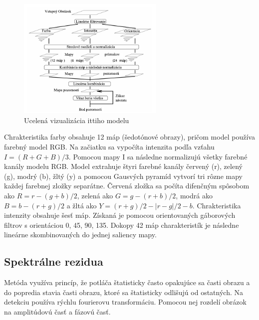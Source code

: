 \begin{figure}[H]
 \centering
 \includegraphics[width=7cm]{pics/itti-1-svk.png}
 \caption{Ucelená vizualizácia ittiho modelu\cite{itty-98}}\label{wrap-fig:1}
\end{figure}
\vspace{10mm}

Chrakteristika farby obsahuje 12 máp (šedotónové obrazy), pričom model používa farebný model RGB.
Na začiatku sa vypočíta intenzita podľa vzťahu \begin{math} I = (R+G+B)/3\end{math}.
Pomocou mapy I sa následne normalizujú všetky farebné kanály modelu RGB.
Model extrahuje štyri farebné kanály červený (r), zelený (g), modrý (b), žltý (y) a pomocou Gausvých pyramíd vytvorí tri rôzne mapy každej farebnej zložky separátne.
Červená zložka sa počíta difenčným spôsobom ako \begin{math} R = r - (g + b)/2 \end{math}, zelená ako \begin{math} G = g - (r + b)/2 \end{math}, modrá ako \begin{math}B = b - (r + g)/2\end{math} a žltá ako \begin{math}Y = (r + g)/2 - |r - g|/2 - b\end{math}.
Chrakteristika intenzity obsahuje šesť máp.
Získaná je pomocou orientovaných gáborových filtrov s orientáciou 0\degree, 45\degree, 90\degree, 135\degree.
Dokopy 42 máp charakteristík je následne lineárne skombinovaných do jednej saliency mapy\cite{itty-98}.


\subsection{Spektrálne rezidua}
Metóda využíva princíp, že potláča štatisticky často opakujúce sa časti obrazu a do popredia stavia časti obrazu, ktoré sa štatisticky odlišujú od ostatných.
Na detekciu používa rýchlu fourierovu transformáciu.
Pomocou nej rozdelí obrázok na amplitúdovú časť a fázovú časť.

